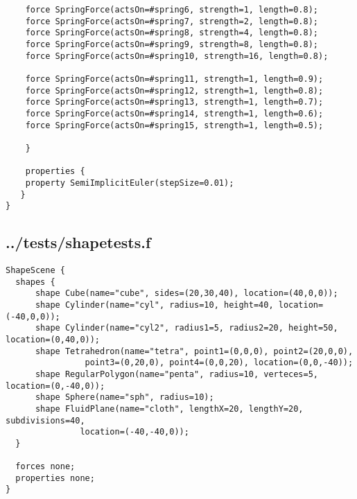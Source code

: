 \begin{lstlisting}
	force SpringForce(actsOn=#spring6, strength=1, length=0.8);
	force SpringForce(actsOn=#spring7, strength=2, length=0.8);
	force SpringForce(actsOn=#spring8, strength=4, length=0.8);
	force SpringForce(actsOn=#spring9, strength=8, length=0.8);
	force SpringForce(actsOn=#spring10, strength=16, length=0.8);

	force SpringForce(actsOn=#spring11, strength=1, length=0.9);
	force SpringForce(actsOn=#spring12, strength=1, length=0.8);
	force SpringForce(actsOn=#spring13, strength=1, length=0.7);
	force SpringForce(actsOn=#spring14, strength=1, length=0.6);
	force SpringForce(actsOn=#spring15, strength=1, length=0.5);

    }

    properties { 
	property SemiImplicitEuler(stepSize=0.01);
   }
}
\end{lstlisting}

\subsection*{../tests/shapetests.f}
\begin{lstlisting}
ShapeScene {
  shapes {
      shape Cube(name="cube", sides=(20,30,40), location=(40,0,0));
      shape Cylinder(name="cyl", radius=10, height=40, location=(-40,0,0));
      shape Cylinder(name="cyl2", radius1=5, radius2=20, height=50, location=(0,40,0));
      shape Tetrahedron(name="tetra", point1=(0,0,0), point2=(20,0,0), 
      			point3=(0,20,0), point4=(0,0,20), location=(0,0,-40));
      shape RegularPolygon(name="penta", radius=10, verteces=5, location=(0,-40,0));
      shape Sphere(name="sph", radius=10);
      shape FluidPlane(name="cloth", lengthX=20, lengthY=20, subdivisions=40,
		       location=(-40,-40,0));
  }
  
  forces none;
  properties none;
}
\end{lstlisting}

